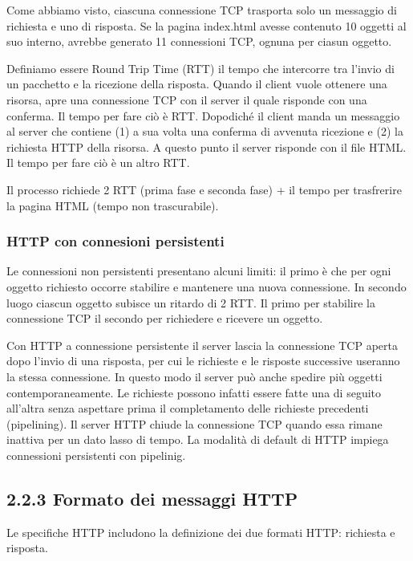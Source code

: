 \documentclass{book}
\begin{document}
Come abbiamo visto, ciascuna connessione TCP trasporta solo un messaggio di richiesta e uno di risposta. Se la pagina index.html avesse contenuto 10 oggetti al suo interno, avrebbe generato 11 connessioni TCP, ognuna per ciasun oggetto.

Definiamo essere Round Trip Time (RTT) il tempo che intercorre tra l'invio di un pacchetto e la ricezione della risposta. Quando il client vuole ottenere una risorsa, apre una connessione TCP con il server il quale risponde con una conferma. Il tempo per fare ciò è RTT. Dopodiché il client manda un messaggio al server che contiene (1) a sua volta una conferma di avvenuta ricezione e (2) la richiesta HTTP della risorsa. A questo punto il server risponde con il file HTML. Il tempo per fare ciò è un altro RTT.

Il processo richiede 2 RTT (prima fase e seconda fase) + il tempo per trasfrerire la pagina HTML (tempo non trascurabile).

\subsubsection{HTTP con connesioni persistenti}
Le connessioni non persistenti presentano alcuni limiti: il primo è che per ogni oggetto richiesto occorre stabilire e mantenere una nuova connessione. In secondo luogo ciascun oggetto subisce un ritardo di 2 RTT. Il primo per stabilire la connessione TCP il secondo per richiedere e ricevere un oggetto.

Con HTTP a connessione persistente il server lascia la connessione TCP aperta dopo l'invio di una risposta, per cui le richieste e le risposte successive useranno la stessa connessione. In questo modo il server può anche spedire più oggetti contemporaneamente. Le richieste possono infatti essere fatte una di seguito all'altra senza aspettare prima il completamento delle richieste precedenti (pipelining). Il server HTTP chiude la connessione TCP quando essa rimane inattiva per un dato lasso di tempo. La modalità di default di HTTP impiega connessioni persistenti con pipelinig.

\subsection*{2.2.3 Formato dei messaggi HTTP}
Le specifiche HTTP includono la definizione dei due formati HTTP: richiesta e risposta.
\end{document}
